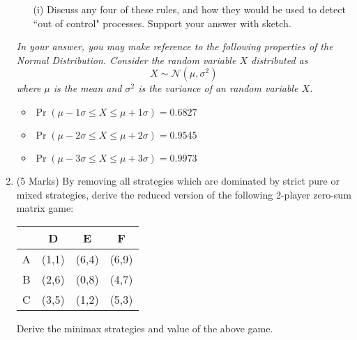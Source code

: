 \documentclass[a4paper,12pt]{article}
\begin{document}
\begin{enumerate}
\begin{itemize}
	\item[(i)] Discuss any four of these rules, and how they would be used to detect ``out of control" processes. Support your answer with sketch.
\end{itemize}

\bigskip 
\begin{framed}
	\noindent \textit{In your answer, you may make reference to the following properties of the Normal Distribution. Consider the random variable $X$ distributed as
		\[X \sim \mathcal{N}(\mu,\sigma^2)\]
		where $\mu$ is the mean and $\sigma^2$ is the variance of an random variable $X$.}
	\begin{itemize}
		\item $\Pr( \mu - 1\sigma \leq X \leq \mu + 1\sigma ) = 0.6827$
		\item $\Pr( \mu - 2\sigma \leq X \leq \mu + 2\sigma ) = 0.9545$
		\item $\Pr( \mu - 3\sigma \leq X \leq \mu + 3\sigma )= 0.9973$
		
	\end{itemize}
\end{framed}
\item  (5 Marks) By removing all strategies which are dominated by strict pure or mixed strategies, derive the reduced version of the following 2-player zero-sum matrix game:

\begin{center}
	
	\begin{tabular}{|c||c|c|c|}
		\hline
		& D         &E       &F    \\
		\hline \hline
		A & (1,1)& (6,4)& (6,9) \\ \hline 
		B & (2,6)& (0,8)& (4,7) \\ \hline 
		C & (3,5)& (1,2)& (5,3) \\ \hline 
		
		
		\hline
		
	\end{tabular}
\end{center} %
 Derive the minimax strategies and value of the above game.%

 	\end{enumerate}
 
\end{document}

